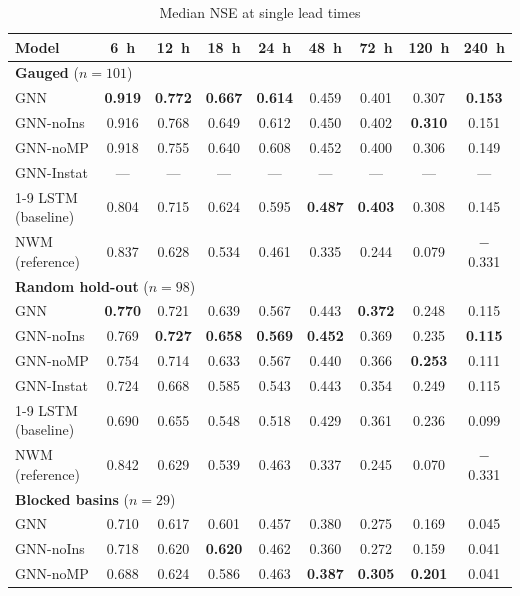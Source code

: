 \begin{table}
\centering
\caption{Median NSE at single lead times}
\label{tab:skill-leads}
\footnotesize
\renewcommand{\arraystretch}{1.2}
\begin{tabular*}{\textwidth}{@{\extracolsep{\fill}}lcccccccc@{}}
\toprule
Model & 6~h & 12~h & 18~h & 24~h & 48~h & 72~h & 120~h & 240~h \\
\midrule
\multicolumn{9}{l}{\textbf{Gauged} ($n = 101$)} \\
GNN & \textbf{0.919} & \textbf{0.772} & \textbf{0.667} & \textbf{0.614} & 0.459 & 0.401 & 0.307 & \textbf{0.153} \\
GNN-noIns & 0.916 & 0.768 & 0.649 & 0.612 & 0.450 & 0.402 & \textbf{0.310} & 0.151 \\
GNN-noMP & 0.918 & 0.755 & 0.640 & 0.608 & 0.452 & 0.400 & 0.306 & 0.149 \\
GNN-Instat & --- & --- & --- & --- & --- & --- & --- & --- \\
\cmidrule{1-9}
LSTM (baseline) & 0.804 & 0.715 & 0.624 & 0.595 & \textbf{0.487} & \textbf{0.403} & 0.308 & 0.145 \\
NWM (reference) & 0.837 & 0.628 & 0.534 & 0.461 & 0.335 & 0.244 & 0.079 & $-$0.331 \\
\midrule
\multicolumn{9}{l}{\textbf{Random hold-out} ($n = 98$)} \\
GNN & \textbf{0.770} & 0.721 & 0.639 & 0.567 & 0.443 & \textbf{0.372} & 0.248 & 0.115 \\
GNN-noIns & 0.769 & \textbf{0.727} & \textbf{0.658} & \textbf{0.569} & \textbf{0.452} & 0.369 & 0.235 & \textbf{0.115} \\
GNN-noMP & 0.754 & 0.714 & 0.633 & 0.567 & 0.440 & 0.366 & \textbf{0.253} & 0.111 \\
GNN-Instat & 0.724 & 0.668 & 0.585 & 0.543 & 0.443 & 0.354 & 0.249 & 0.115 \\
\cmidrule{1-9}
LSTM (baseline) & 0.690 & 0.655 & 0.548 & 0.518 & 0.429 & 0.361 & 0.236 & 0.099 \\
NWM (reference) & 0.842 & 0.629 & 0.539 & 0.463 & 0.337 & 0.245 & 0.070 & $-$0.331 \\
\midrule
\multicolumn{9}{l}{\textbf{Blocked basins} ($n = 29$)} \\
GNN & 0.710 & 0.617 & 0.601 & 0.457 & 0.380 & 0.275 & 0.169 & 0.045 \\
GNN-noIns & 0.718 & 0.620 & \textbf{0.620} & 0.462 & 0.360 & 0.272 & 0.159 & 0.041 \\
GNN-noMP & 0.688 & 0.624 & 0.586 & 0.463 & \textbf{0.387} & \textbf{0.305} & \textbf{0.201} & 0.041 \\

\end{tabular*}
\end{table}
